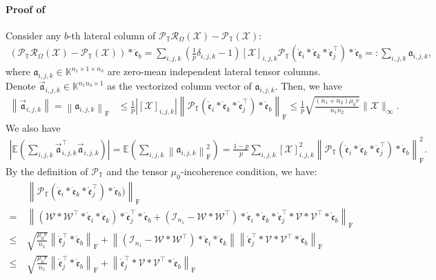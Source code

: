 \documentclass[twoside,12pt]{article}
\def\fro{{\mathrm{F}}}
\def\fro{{\mathrm{F}}}
\def\dme{{\dot{\mathfrak{e}}}}
\def\mrme{{\mathring{\mathfrak{e}}}}
\begin{document}
\paragraph{Proof of }
Consider any $b$-th lateral column of $\mathcal{P}_{\mathbb{T}}\mathcal{R}_{\Omega}(\mathcal{X})-\mathcal{P}_{\mathbb{T}}(\mathcal{X})$:
\begin{align*}
\left(\mathcal{P}_{\mathbb{T}}\mathcal{R}_{\Omega}(\mathcal{X})-\mathcal{P}_{\mathbb{T}}(\mathcal{X})\right)*\mrme_{b} =\sum\limits_{i,j,k}(\frac{1}{p}\delta_{i,j,k}-1)[\mathcal{X}]_{i,j,k}\mathcal{P}_{\mathbb{T}}(\mrme_i*\dme_k*\mrme_j^{\top})*\mrme_b  =: \sum\limits_{i,j,k}\mathfrak{a}_{i,j,k},
\end{align*}
where $\mathfrak{a}_{i,j,k}\in \mathbb{K}^{n_1\times 1 \times n_3}$ are zero-mean independent lateral tensor columns. Denote $\vec{\mathfrak{a}}_{i,j,k}\in \mathbb{K}^{n_{1}n_{3}\times 1}$ as the vectorized column vector of $\mathfrak{a}_{i,j,k}$. Then, we have 
\begin{align*}
    \left\|\vec{\mathfrak{a}}_{i,j,k}\right\|  = \left\|\mathfrak{a}_{i,j,k}\right\|_{\fro} 
    &\leq \frac{1}{p}|[\mathcal{X}]_{i,j,k}|\left\|\mathcal{P}_{\mathbb{T}}(\mrme_i*\dme_k*\mrme_j^{\top})*\mrme_b\right\|_{\fro}\leq \frac{1}{p}\sqrt{\frac{(n_1+n_2)\mu_{0}r}{n_{1}n_{2}}}\|\mathcal{X}\|_{\infty}.
\end{align*}
We also have 
\begin{align*}
  \left|\mathbb{E}(\sum\limits_{i,j,k}\vec{\mathfrak{a}}_{i,j,k}^{\top}\vec{\mathfrak{a}}_{i,j,k})\right|  = \mathbb{E}(\sum\limits_{i,j,k}\left\|\mathfrak{a}_{i,j,k}\right\|_{\fro}^2)  = \frac{1-p}{p}\sum\limits_{i,j,k}[\mathcal{X}]_{i,j,k}^2\left\|\mathcal{P}_{\mathbb{T}}(\mrme_i*\dme_k*\mrme_j^{\top})*\mrme_b\right\|_{\fro}^2.
\end{align*}
By the definition of $\mathcal{P}_{\mathbb{T}}$ and the tensor $\mu_0$-incoherence condition, we have:
\begin{align*}
&~\left\|\mathcal{P}_{\mathbb{T}}(\mrme_i*\dme_k*\mrme_j^{\top})*\mrme_b)\right\|_{\fro} \\
=&~\left\|(\mathcal{W}*\mathcal{W}^{\top}*\mrme_i*\dme_k)*\mrme_j^{\top}*\mrme_b+(\mathcal{I}_{n_1}-\mathcal{W}*\mathcal{W}^{\top})*\mrme_i*\dme_k*\mrme_j^{\top}*\mathcal{V}*\mathcal{V}^{\top}*\mrme_{b}\right\|_{\fro} \\
\leq&~ \sqrt{\frac{\mu_0 r}{n_1}}\left\|\mrme_j^{\top} * \mrme_b\right\|_{\fro}+\left\|(\mathcal{I}_{n_1}-\mathcal{W}*\mathcal{W}^{\top})*\mrme_i*\dme_k\right\|\left\|\mrme_j^{\top} * \mathcal{V} * \mathcal{V}^{\top} * \mrme_b\right\|_{\fro} \\
\leq&~  \sqrt{\frac{\mu_0 r}{n_1}}\left\|\mrme_j^{\top} * \mrme_b\right\|_{\fro}+\left\|\mrme_j^{\top} * \mathcal{V} * \mathcal{V}^{\top} * \mrme_b\right\|_{\fro} 
\end{align*}
\end{document}
